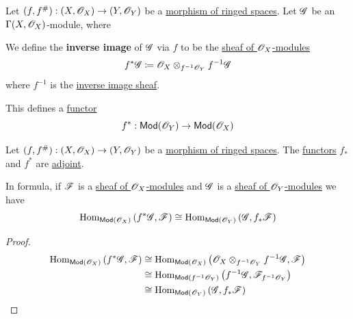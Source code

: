 \documentclass[../../../main]{subfiles}
\begin{document}

\begin{definition} \label{def:inverse-image-ox-mod}
  Let \((f, f^{\#}): (X, \mathscr{O}_{X}) \to (Y, \mathscr{O}_{Y})\) be a \hyperref[def:ringed-space]{morphism of ringed spaces}.
  Let \(\mathscr{G}\) be an \(\Gamma(X, \mathscr{O}_{X})\)-module, where

  We define the \textbf{inverse image} of \(\mathscr{G}\) via \(f\) to be the \hyperref[def:sheaf-of-modules]{sheaf of \(\mathscr{O}_{X}\)-modules}
  \begin{equation*}
    f^{\ast}\mathscr{G} \coloneq \mathscr{O}_{X} \otimes_{f^{-1}\mathscr{O}_{Y}} f^{-1}\mathscr{G}
  \end{equation*}
  where \(f^{-1}\) is the \hyperref[def:inverse-image-sheaf]{inverse image sheaf}.

  This defines a \hyperref[def:functor]{functor}
  \begin{equation*}
    f^{\ast}: \mathsf{Mod}(\mathscr{O}_{Y}) \to \mathsf{Mod}(\mathscr{O}_{X})
  \end{equation*}

\end{definition}


\begin{theorem} \label{thm:direct-inverse-adjunction-ringed-space}
  Let \((f, f^{\#}): (X, \mathscr{O}_{X}) \to (Y, \mathscr{O}_{Y})\) be a \hyperref[def:ringed-space]{morphism of ringed spaces}.
  The \hyperref[def:functor]{functors} \(f_{\ast}\) and \(f^{\ast}\) are \hyperref[def:adjoint-functors]{adjoint}.

  In formula, if \(\mathscr{F}\) is a \hyperref[def:sheaf-of-modules]{sheaf of \(\mathscr{O}_{X}\)-modules} and \(\mathscr{G}\) is a \hyperref[def:sheaf-of-modules]{sheaf of \(\mathscr{O}_{Y}\)-modules} we have
  \begin{equation*}
    \operatorname{Hom}_{\mathsf{Mod}(\mathscr{O}_{X})} \left( f^{\ast}\mathscr{G}, \mathscr{F} \right) \cong \operatorname{Hom}_{\mathsf{Mod}(\mathscr{O}_{Y})} \left( \mathscr{G}, f_{\ast}\mathscr{F} \right)
  \end{equation*}
\end{theorem}
\begin{proof}
\begin{align*}
  \operatorname{Hom}_{\mathsf{Mod} (\mathscr{O}_{X})} \left( f^{\ast}\mathscr{G}, \mathscr{F} \right) &\cong \operatorname{Hom}_{\mathsf{Mod} (\mathscr{O}_{X})} \left( \mathscr{O}_{X} \otimes_{f^{-1} \mathscr{O}_{Y}} f^{-1}\mathscr{G}, \mathscr{F} \right) \\
                                                                       &\cong \operatorname{Hom}_{\mathsf{Mod} (f^{-1} \mathscr{O}_{Y})} \left( f^{-1}\mathscr{G}, \mathscr{F}_{f^{-1}\mathscr{O}_{Y}} \right) \\
                                                                       &\cong  \operatorname{Hom}_{\mathsf{Mod}(\mathscr{O}_{Y})} \left( \mathscr{G}, f_{\ast}\mathscr{F} \right)
\end{align*}
\end{proof}
\end{document}
